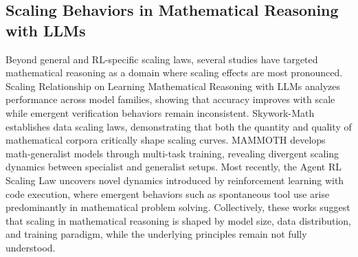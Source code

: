 \subsection{Scaling Behaviors in Mathematical Reasoning with LLMs}
Beyond general and RL-specific scaling laws, several studies have targeted mathematical reasoning as a domain where scaling effects are most pronounced. Scaling Relationship on Learning Mathematical Reasoning with LLMs \citep{touvron2023scaling} analyzes performance across model families, showing that accuracy improves with scale while emergent verification behaviors remain inconsistent. Skywork-Math \citep{ye2024skywork} establishes data scaling laws, demonstrating that both the quantity and quality of mathematical corpora critically shape scaling curves. MAMMOTH \citep{yue2023mammoth} develops math-generalist models through multi-task training, revealing divergent scaling dynamics between specialist and generalist setups. Most recently, the Agent RL Scaling Law \citep{zeng2025agent} uncovers novel dynamics introduced by reinforcement learning with code execution, where emergent behaviors such as spontaneous tool use arise predominantly in mathematical problem solving. Collectively, these works suggest that scaling in mathematical reasoning is shaped by model size, data distribution, and training paradigm, while the underlying principles remain not fully understood.
